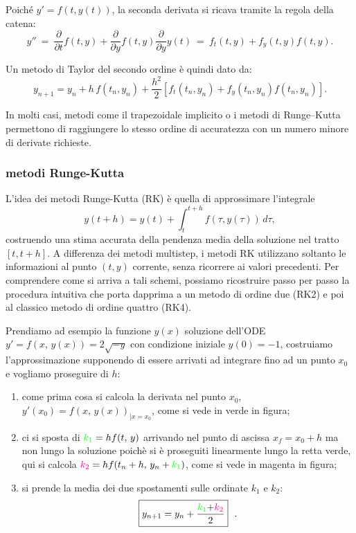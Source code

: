 Poiché $y' = f(t, y(t))$, la seconda derivata si ricava tramite la regola della catena:
\[
y'' \ =\ \frac{\partial}{\partial t}f(t,y) + \frac{\partial}{\partial y}f(t,y) \frac{\partial}{\partial y} y(t)
\ =\ f_t(t,y) + f_y(t,y) f(t,y).
\]

Un metodo di Taylor del secondo ordine è quindi dato da:
\[
y_{n+1}
= y_n
+ h\, f(t_n, y_n)
+ \frac{h^2}{2}
\left[
f_t(t_n,y_n)
+ f_y(t_n,y_n) f(t_n,y_n)
\right].
\]

In molti casi, metodi come il trapezoidale implicito o i metodi di Runge--Kutta
permettono di raggiungere lo stesso ordine di accuratezza con un numero minore di derivate richieste.


%
%
\subsubsection{metodi Runge-Kutta}

L'idea dei metodi Runge-Kutta (RK) è quella di approssimare l'integrale
\[
y(t+h) = y(t) + \int_{t}^{t+h} f(\tau, y(\tau))\, d\tau,
\]
costruendo una stima accurata della pendenza media della soluzione nel tratto
$[t, t+h]$. A differenza dei metodi multistep, i metodi RK utilizzano soltanto
le informazioni al punto $(t,y)$ corrente, senza ricorrere ai valori precedenti.
%
Per comprendere come si arriva a tali schemi, possiamo ricostruire passo per passo 
la procedura intuitiva che porta dapprima a un metodo di ordine due (RK2) e poi
al classico metodo di ordine quattro (RK4).
%

	
Prendiamo ad esempio la funzione $y(x)$ soluzione dell'ODE $y'=f(x, \, y(x))=2\sqrt{-y}$ con condizione iniziale $y(0)=-1$, costruiamo l'approssimazione supponendo di essere arrivati ad integrare fino ad un punto $x_0$ e vogliamo proseguire di $h$:
\begin{enumerate}
		\item come prima cosa si calcola la derivata nel punto $x_0$, $y'(x_0) = f(x, \, y(x))_{|x=x_0}$, come si vede in verde in figura;
		\item ci si sposta di $\color{green}{k_1} \color{black}= h f(t,\, y)$ arrivando nel punto di ascissa $x_f=x_0+h$ ma non lungo la soluzione poichè si è proseguiti linearmente lungo la retta verde, qui si calcola $\color{magenta}{k_2} \color{black}= h f(t_n + h,\,  y_n + \color{green}{k_1} \color{black})$, come si vede in magenta in figura;
		\item si prende la media dei due spostamenti sulle ordinate $k_1$ e $k_2$:
		\[\boxed{y_{n+1} = y_n + \frac{\color{green}{k_1} \color{black}{+} \color{magenta}{k_2}}{2}} \ \ .\]
\end{enumerate}
	
